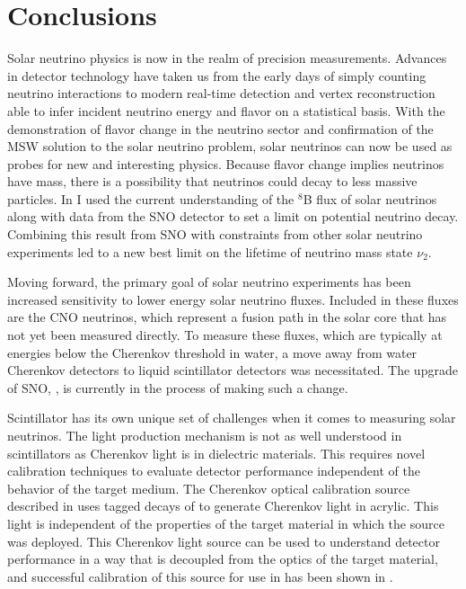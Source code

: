 \chapter{Conclusions}

Solar neutrino physics is now in the realm of precision measurements.
Advances in detector technology have taken us from the early days of simply counting neutrino interactions to modern real-time detection and vertex reconstruction able to infer incident neutrino energy and flavor on a statistical basis.
With the demonstration of flavor change in the neutrino sector and confirmation of the MSW solution to the solar neutrino problem, solar neutrinos can now be used as probes for new and interesting physics.
Because flavor change implies neutrinos have mass, there is a possibility that neutrinos could decay to less massive particles.
In  I used the current understanding of the $^8$B flux of solar neutrinos along with data from the SNO detector to set a limit on potential neutrino decay.
Combining this result from SNO with constraints from other solar neutrino experiments led to a new best limit on the lifetime of neutrino mass state $\nu_2$.

Moving forward, the primary goal of solar neutrino experiments has been increased sensitivity to lower energy solar neutrino fluxes.
Included in these fluxes are the CNO neutrinos, which represent a fusion path in the solar core that has not yet been measured directly.
To measure these fluxes, which are typically at energies below the Cherenkov threshold in water, a move away from water Cherenkov detectors to liquid scintillator detectors was necessitated.
The upgrade of SNO, {\snop}, is currently in the process of making such a change.

Scintillator has its own unique set of challenges when it comes to measuring solar neutrinos.
The light production mechanism is not as well understood in scintillators as Cherenkov light is in dielectric materials.
This requires novel calibration techniques to evaluate detector performance independent of the behavior of the target medium.
The Cherenkov optical calibration source described in  uses tagged decays of \Li to generate Cherenkov light in acrylic.
This light is independent of the properties of the target material in which the source was deployed.
This Cherenkov light source can be used to understand detector performance in a way that is decoupled from the optics of the target material, and successful calibration of this source for use in {\snop} has been shown in .

